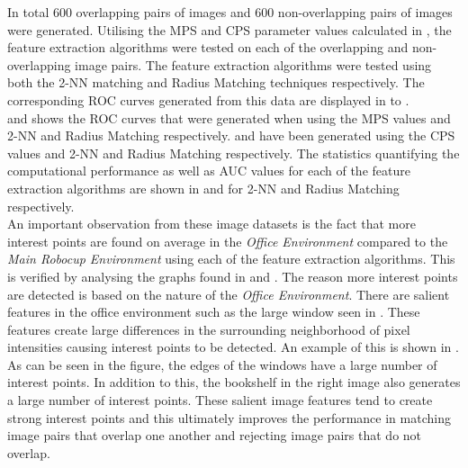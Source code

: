 \documentclass{report}
\begin{document}
In total $600$ overlapping pairs of images and $600$ non-overlapping pairs of images were generated. Utilising the MPS and CPS parameter values calculated in , the feature extraction algorithms were tested on each of the overlapping and non-overlapping image pairs. The feature extraction algorithms were tested using both the 2-NN matching and Radius Matching techniques respectively. The corresponding ROC curves generated from this data are displayed in  to . \\

 and  shows the ROC curves that were generated when using the MPS values and 2-NN and Radius Matching respectively.  and  have been generated using the CPS values and 2-NN and Radius Matching respectively. The statistics quantifying the computational performance as well as AUC values for each of the feature extraction algorithms are shown in  and  for 2-NN and Radius Matching respectively. \\

An important observation from these image datasets is the fact that more interest points are found on average in the \textit{Office Environment} compared to the \textit{Main Robocup Environment} using each of the feature extraction algorithms. This is verified by analysing the graphs found in  and . The reason more interest points are detected is based on the nature of the \textit{Office Environment}. There are salient features in the office environment such as the large window seen in . These features create large differences in the surrounding neighborhood of pixel intensities causing interest points to be detected. An example of this is shown in . As can be seen in the figure, the edges of the windows have a large number of interest points. In addition to this, the bookshelf  in the right image also generates a large number of interest points. These salient image features tend to create strong interest points and this ultimately improves the performance in matching image pairs that overlap one another and rejecting image pairs that do not overlap. \\
\end{document}
